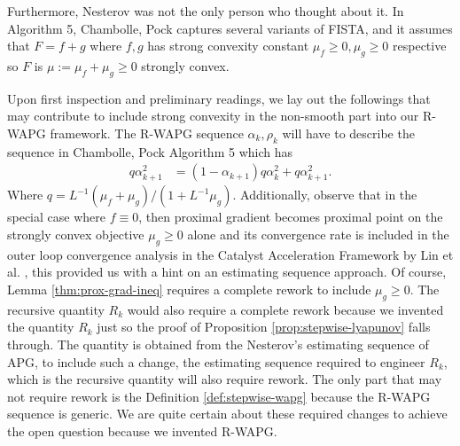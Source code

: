 \documentclass[12pt]{article}
\begin{document}
            \par
            Furthermore, Nesterov was not the only person who thought about it.
            In Algorithm 5, Chambolle, Pock \cite{chambolle_introduction_2016} captures several variants of FISTA, and it assumes that $F = f + g$ where $f, g$ has strong convexity constant $\mu_f \ge 0, \mu_g \ge 0$ respective so $F$ is $\mu := \mu_f + \mu_g \ge 0$ strongly convex. 
            \par
            Upon first inspection and preliminary readings, we lay out the followings that may contribute to include strong convexity in the non-smooth part into our R-WAPG framework. 
            The R-WAPG sequence $\alpha_k, \rho_k$ will have to describe the sequence in Chambolle, Pock \cite{chambolle_introduction_2016} Algorithm 5 which has 
            \begin{align*}
                q \alpha_{k + 1}^2 &= (1 - \alpha_{k + 1})q\alpha_k^2 + q \alpha_{k + 1}^2. 
            \end{align*}
            Where $q = L^{-1}(\mu_f + \mu_g)/(1 + L^{-1}\mu_g)$. 
            Additionally, observe that in the special case where $f \equiv 0$, then proximal gradient becomes proximal point on the strongly convex objective $\mu_g \ge0$ alone and its convergence rate is included in the outer loop convergence analysis in the Catalyst Acceleration Framework by Lin et al. \cite{lin_universal_2015}, this provided us with a hint on an estimating sequence approach. 
            Of course, Lemma \ref{thm:prox-grad-ineq} requires a complete rework to include $\mu_g \ge0$. 
            The recursive quantity $R_k$ would also require a complete rework because we invented the quantity $R_k$ just so the proof of Proposition \ref{prop:stepwise-lyapunov} falls through. 
            The quantity is obtained from the Nesterov's estimating sequence of APG, to include such a change, the estimating sequence required to engineer $R_k$, which is the recursive quantity will also require rework. 
            The only part that may not require rework is the Definition \ref{def:stepwise-wapg} because the R-WAPG sequence is generic. 
            We are quite certain about these required changes to achieve the open question because we invented R-WAPG. 
            
\end{document}
